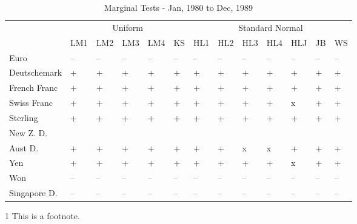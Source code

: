 \documentclass[12pt]{article}
\begin{document}
\newcommand{\checkplus}[0]{\checkmark +}

\begin{table}
	\caption{Marginal Tests - Jan, 1980 to Dec, 1989}
	\begin{threeparttable}
		\begin{tabular}[l]{l l l l l l l l l l l l l}
	    \hline
	& \multicolumn{5}{c}{Uniform}  & \multicolumn{7}{c}{Standard Normal} \\
			            & LM1        & LM2        & LM3        & LM4        & KS         & HL1        & HL2        & HL3        & HL4        & HLJ        & JB         & WS \\
	\hline
	    Euro            & --  & --  & --  & --  & -- & --  & --  & --  & --  & --  & -- & -- \\
		Deutschemark    & \checkplus & \checkplus & \checkplus & \checkplus & \checkplus & \checkplus & \checkplus & \checkplus & \checkplus & \checkplus & \checkplus & \checkplus \\
		French Franc    & \checkplus & \checkplus & \checkplus & \checkplus & \checkplus & \checkplus & \checkplus & \checkplus & \checkplus & \checkplus & \checkplus & \checkplus \\
		Swiss Franc     & \checkplus & \checkplus & \checkplus & \checkplus & \checkplus & \checkplus & \checkplus & \checkplus & \checkplus & x          & \checkplus & \checkplus \\
		Sterling        & \checkplus & \checkplus & \checkplus & \checkplus & \checkplus & \checkplus & \checkplus & \checkplus & \checkplus & \checkplus & \checkplus & \checkplus \\
		New Z. D.       &  &  &  &  &  &  &  & \\
		Aust D.         & \checkplus & \checkplus & \checkplus & \checkplus & \checkplus & \checkplus & \checkplus & x          & x          & \checkplus & \checkplus & \checkplus \\
		Yen             & \checkplus & \checkplus & \checkplus & \checkplus & \checkplus & \checkplus & \checkplus & \checkplus & \checkplus & x          & \checkplus & \checkplus \\
		Won             & --  & --  & --  & --  & -- & --  & --  & --  & --  & --  & -- & -- \\
		Singapore D.    & --  & --  & --  & --  & -- & --  & --  & --  & --  & --  & -- & -- \\
	\hline
		\end{tabular}
		\begin{tablenotes}
			\item[1]{\footnotesize This is a footnote.}
		\end{tablenotes}
	\end{threeparttable}
\end{table}
\end{document}
